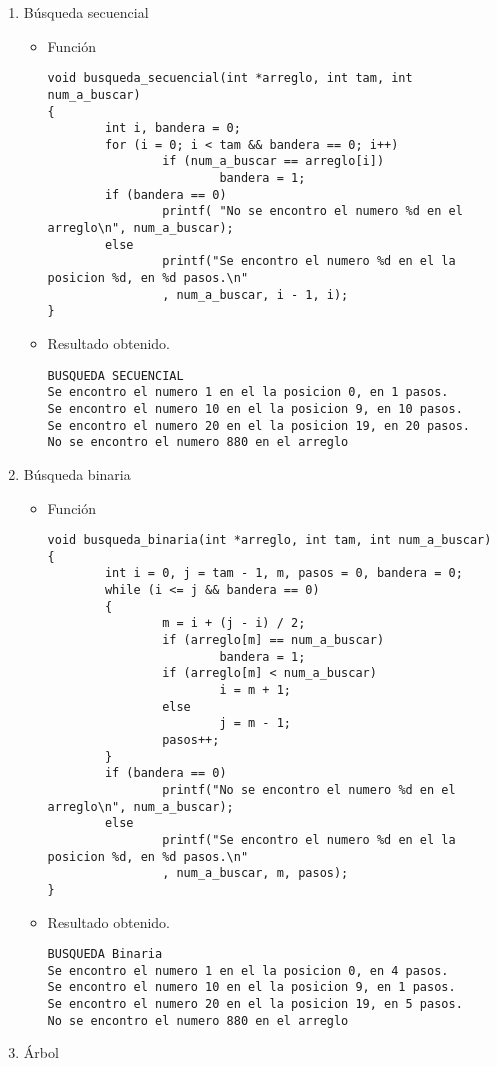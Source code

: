 \documentclass[a4paper,12pt]{article}
\begin{document}
\begin{enumerate}
\item Búsqueda secuencial
\begin{itemize}
\item Función
\\ \lstset{basicstyle=\tiny,style=myCustomMatlabStyle}
\begin{lstlisting}
void busqueda_secuencial(int *arreglo, int tam, int num_a_buscar)
{
        int i, bandera = 0;
        for (i = 0; i < tam && bandera == 0; i++)
                if (num_a_buscar == arreglo[i])
                        bandera = 1;
        if (bandera == 0)
                printf( "No se encontro el numero %d en el arreglo\n", num_a_buscar);
        else
                printf("Se encontro el numero %d en el la posicion %d, en %d pasos.\n"
                , num_a_buscar, i - 1, i);
}
\end{lstlisting}
\item Resultado obtenido.
\\ \lstset{basicstyle=\tiny}
\begin{lstlisting}
BUSQUEDA SECUENCIAL
Se encontro el numero 1 en el la posicion 0, en 1 pasos.
Se encontro el numero 10 en el la posicion 9, en 10 pasos.
Se encontro el numero 20 en el la posicion 19, en 20 pasos.
No se encontro el numero 880 en el arreglo
\end{lstlisting}
\end{itemize}
\item Búsqueda binaria
\begin{itemize}
\item Función

\lstset{basicstyle=\tiny}
\begin{lstlisting}
void busqueda_binaria(int *arreglo, int tam, int num_a_buscar)
{
        int i = 0, j = tam - 1, m, pasos = 0, bandera = 0;
        while (i <= j && bandera == 0)
        {
                m = i + (j - i) / 2;
                if (arreglo[m] == num_a_buscar)
                        bandera = 1;
                if (arreglo[m] < num_a_buscar)
                        i = m + 1;
                else
                        j = m - 1;
                pasos++;
        }
        if (bandera == 0)
                printf("No se encontro el numero %d en el arreglo\n", num_a_buscar);
        else
                printf("Se encontro el numero %d en el la posicion %d, en %d pasos.\n"
                , num_a_buscar, m, pasos);
}

\end{lstlisting}

\item Resultado obtenido.

\begin{lstlisting}
BUSQUEDA Binaria
Se encontro el numero 1 en el la posicion 0, en 4 pasos.
Se encontro el numero 10 en el la posicion 9, en 1 pasos.
Se encontro el numero 20 en el la posicion 19, en 5 pasos.
No se encontro el numero 880 en el arreglo
\end{lstlisting}

\end{itemize}
\item Árbol
\end{enumerate}
\end{document}
